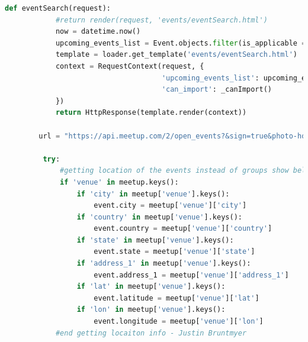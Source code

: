 \documentclass[draftclsnofoot,10pt,onecolumn]{IEEEtran} %
\begin{document}
\begin{center}
\captionsetup{width=.5\linewidth}
	\begin{lstlisting}[caption=Views.py shows the eventSearch funciton that allows the view in the template for the events page to pull information from the database. This also shows the URL used to get the info about events along with how it is stored., language=Python]
        def eventSearch(request):
            #return render(request, 'events/eventSearch.html')
            now = datetime.now()
            upcoming_events_list = Event.objects.filter(is_applicable = True).filter(local_start__gte=now).order_by('local_start')
            template = loader.get_template('events/eventSearch.html')
            context = RequestContext(request, {
                                     'upcoming_events_list': upcoming_events_list,
                                     'can_import': _canImport()
            })
            return HttpResponse(template.render(context))
            
        url = "https://api.meetup.com/2/open_events?&sign=true&photo-host=public&state=ky&city=lexington&country=usa&topic=" + hashtag.name + "&radius=10000&sign=true&key=" + MEETUP_API_KEY

         try:
             #getting location of the events instead of groups show below - Justin Bruntmyer
             if 'venue' in meetup.keys():
                 if 'city' in meetup['venue'].keys():
                     event.city = meetup['venue']['city']
                 if 'country' in meetup['venue'].keys():
                     event.country = meetup['venue']['country']
                 if 'state' in meetup['venue'].keys():
                     event.state = meetup['venue']['state']
                 if 'address_1' in meetup['venue'].keys():
                     event.address_1 = meetup['venue']['address_1']
                 if 'lat' in meetup['venue'].keys():
                     event.latitude = meetup['venue']['lat']
                 if 'lon' in meetup['venue'].keys():
                     event.longitude = meetup['venue']['lon']
            #end getting locaiton info - Justin Bruntmyer
	\end{lstlisting}
\end{center}
\end{document}
